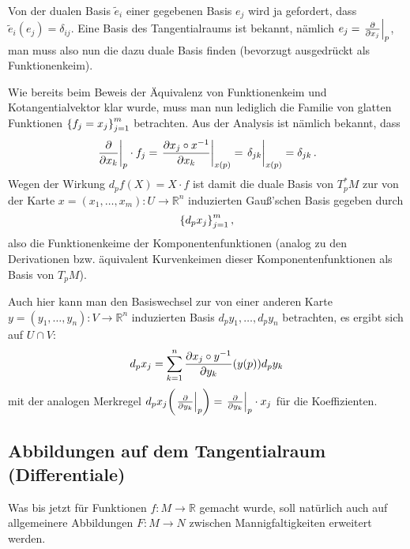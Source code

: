 \documentclass[../H_Analysis_main.tex]{subfiles}
\begin{document}
\begin{bsp}
Von der dualen Basis $\tilde{e}_i$ einer gegebenen Basis $e_j$ wird ja gefordert, dass $\tilde{e}_i (e_j) = \delta_{ij}$. Eine Basis des Tangentialraums ist bekannt, nämlich $e_j = \eval{\pdv{x_j}}_p$, man muss also nun die dazu duale Basis finden (bevorzugt ausgedrückt als Funktionenkeim). 

Wie bereits beim Beweis der Äquivalenz von Funktionenkeim und Kotangentialvektor klar wurde, muss man nun lediglich die Familie von glatten Funktionen $\qty{f_j = x_j}_{j = 1}^m$ betrachten. Aus der Analysis ist nämlich bekannt, dass
\begin{equation*}
\eval{\pdv{x_k}}_p \cdot f_j = \eval{\pdv{x_j \circ x^{-1}}{x_k}}_{x(p)} = \eval{\delta_{jk}}_{x(p)} = \delta_{jk} \, .
\end{equation*}
Wegen der Wirkung $d_p f(X) = X \cdot f$ ist damit die duale Basis von $T^*_p M$ zur von der Karte $x = (x_1, \dots, x_m): U \rightarrow \mathbb{R}^n$ induzierten Gauß'schen Basis gegeben durch
\begin{equation}
\qty{d_p x_j}_{j = 1}^m \, ,
\end{equation}
also die Funktionenkeime der Komponentenfunktionen (analog zu den Derivationen bzw. äquivalent Kurvenkeimen dieser Komponentenfunktionen als Basis von $T_p M$).


Auch hier kann man den Basiswechsel zur von einer anderen Karte $y = (y_1, \dots, y_n): V \rightarrow \mathbb{R}^n$ induzierten Basis $d_p y_1, \dots, d_p y_n$ betrachten, es ergibt sich auf $U \cap V$:
\begin{equation}\label{eq:gausswechseldual}
d_p x_j = \sum_{k = 1}^n \pdv{x_j \circ y^{-1}}{y_k} \qty(y(p)) d_p y_k
\end{equation}
mit der analogen Merkregel $d_p x_j \qty(\eval{\pdv{y_k}}_p) = \eval{\pdv{y_k}}_p \cdot x_j$ für die Koeffizienten.
\end{bsp}



		\subsection{Abbildungen auf dem Tangentialraum (Differentiale)}
Was bis jetzt für Funktionen $f: M \rightarrow \mathbb{R}$ gemacht wurde, soll natürlich auch auf allgemeinere Abbildungen $F: M \rightarrow N$ zwischen Mannigfaltigkeiten erweitert werden.
\end{document}
